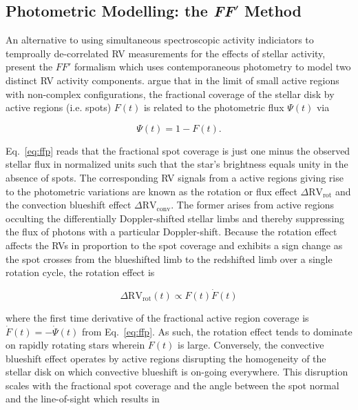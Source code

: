 \subsection{Photometric Modelling: the \textbf{\emph{FF}}$'$ Method}
An alternative to using simultaneous spectroscopic activity indiciators to temproally de-correlated
RV measurements for the effects of stellar activity, \citep{aigrain12} present the $FF'$ formalism
which uses contemporaneous photometry to model two distinct RV activity components. \cite{aigrain12}
argue that in the limit of small active regions with non-complex configurations, the fractional
coverage of the stellar disk by active regions (i.e. spots) $F(t)$ is related to the photometric flux
$\Psi(t)$ via

\begin{equation}
  \Psi(t) = 1 - F(t).
  \label{eq:ffp}
\end{equation}

\noindent Eq.~\ref{eq:ffp} reads that the fractional spot coverage is just one minus the observed
stellar flux in normalized units such that the star's brightness equals unity in the absence of spots.
The corresponding RV signals from a active regions giving rise to the photometric variations are known
as the rotation or flux effect $\Delta \text{RV}_{\text{rot}}$ and the convection blueshift effect
$\Delta \text{RV}_{\text{conv}}$. The former arises from active regions occulting the differentially
Doppler-shifted stellar limbs and thereby suppressing the flux of photons with a particular
Doppler-shift. Because the rotation effect affects the RVs in proportion to the spot coverage and
exhibits a sign change as the spot crosses from the blueshifted limb to the redshifted limb over a single
rotation cycle, the rotation effect is

\begin{equation}
  \Delta \text{RV}_{\text{rot}}(t) \propto F(t) \dot{F}(t)
\end{equation}

\indent where the first time derivative of the fractional active region coverage is
$\dot{F}(t) = -\dot{\Psi}(t)$ from Eq.~\ref{eq:ffp}. As such, the rotation effect tends to dominate
on rapidly rotating stars wherein $\dot{F}(t)$ is large. Conversely, the convective blueshift effect
operates by active regions disrupting the homogeneity of the stellar disk on which convective
blueshift is on-going everywhere. This disruption scales with the fractional spot coverage and
the angle between the spot normal and the line-of-sight which results in

